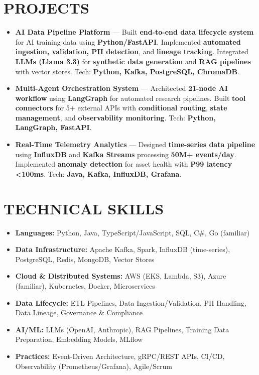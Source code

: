 \documentclass[letterpaper,10pt]{article}
\newcommand{\resumeItem}[1]{\item\small #1}
\begin{document}
\section{\textcolor{metablue}{PROJECTS}}
\vspace{-6pt}
\begin{tcolorbox}[colback=white,colframe=metablue,boxrule=0.8pt,arc=2pt,left=4pt,right=4pt,top=2pt,bottom=2pt,before skip=0pt,after skip=0pt]
\begin{itemize}[topsep=0pt,partopsep=0pt]
\resumeItem{\textbf{AI Data Pipeline Platform} --- Built \textbf{end-to-end data lifecycle system} for AI training data using \textbf{Python/FastAPI}. Implemented \textbf{automated ingestion, validation, PII detection}, and \textbf{lineage tracking}. Integrated \textbf{LLMs (Llama 3.3)} for \textbf{synthetic data generation} and \textbf{RAG pipelines} with vector stores. Tech: \textbf{Python, Kafka, PostgreSQL, ChromaDB}.}
\resumeItem{\textbf{Multi-Agent Orchestration System} --- Architected \textbf{21-node AI workflow} using \textbf{LangGraph} for automated research pipelines. Built \textbf{tool connectors} for 5+ external APIs with \textbf{conditional routing}, \textbf{state management}, and \textbf{observability monitoring}. Tech: \textbf{Python, LangGraph, FastAPI}.}
\resumeItem{\textbf{Real-Time Telemetry Analytics} --- Designed \textbf{time-series data pipeline} using \textbf{InfluxDB} and \textbf{Kafka Streams} processing \textbf{50M+ events/day}. Implemented \textbf{anomaly detection} for asset health with \textbf{P99 latency <100ms}. Tech: \textbf{Java, Kafka, InfluxDB, Grafana}.}
\end{itemize}
\end{tcolorbox}
\vspace{-5pt}

\section{\textcolor{metablue}{TECHNICAL SKILLS}}
\vspace{-5pt}
\small
\begin{itemize}
\resumeItem{\textbf{Languages:} Python, Java, TypeScript/JavaScript, SQL, C\#, Go (familiar)}
\resumeItem{\textbf{Data Infrastructure:} Apache Kafka, Spark, InfluxDB (time-series), PostgreSQL, Redis, MongoDB, Vector Stores}
\resumeItem{\textbf{Cloud \& Distributed Systems:} AWS (EKS, Lambda, S3), Azure (familiar), Kubernetes, Docker, Microservices}
\resumeItem{\textbf{Data Lifecycle:} ETL Pipelines, Data Ingestion/Validation, PII Handling, Data Lineage, Governance \& Compliance}
\resumeItem{\textbf{AI/ML:} LLMs (OpenAI, Anthropic), RAG Pipelines, Training Data Preparation, Embedding Models, MLflow}
\resumeItem{\textbf{Practices:} Event-Driven Architecture, gRPC/REST APIs, CI/CD, Observability (Prometheus/Grafana), Agile/Scrum}
\end{itemize}
\vspace{-10pt}
\end{document}
